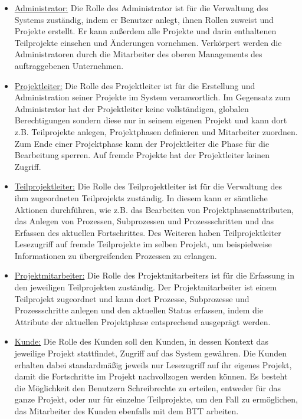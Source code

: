 \begin{itemize}
    \item[] \underline{Administrator:} Die Rolle des Administrator ist für die Verwaltung des Systems zuständig, indem er Benutzer anlegt, ihnen Rollen zuweist und Projekte erstellt. Er kann außerdem alle Projekte und darin enthaltenen Teilprojekte einsehen und Änderungen vornehmen. Verkörpert werden die Administratoren durch die Mitarbeiter des oberen Managements des auftraggebenen Unternehmen.
    
    \item[] \underline{Projektleiter:} Die Rolle des Projektleiter ist für die Erstellung und Administration seiner Projekte im System veranwortlich. Im Gegensatz zum Administrator hat der Projektleiter keine vollständigen, globalen Berechtigungen sondern diese nur in seinem eigenen Projekt und kann dort z.B. Teilprojekte anlegen, Projektphasen definieren und Mitarbeiter zuordnen. Zum Ende einer Projektphase kann der Projektleiter die Phase für die Bearbeitung sperren. Auf fremde Projekte hat der Projektleiter keinen Zugriff. 
    
    \item[] \underline{Teilprojektleiter:} Die Rolle des Teilprojektleiter ist für die Verwaltung des ihm zugeordneten Teilprojekts zuständig. In diesem kann er sämtliche Aktionen durchführen, wie z.B. das Bearbeiten von Projektphasenattributen, das Anlegen von Prozessen, Subprozessen und Prozessschritten und das Erfassen des aktuellen Fortschrittes. Des Weiteren haben Teilprojektleiter Lesezugriff auf fremde Teilprojekte im selben Projekt, um beispielweise Informationen zu übergreifenden Prozessen zu erlangen.

    \item[] \underline{Projektmitarbeiter:} Die Rolle des Projektmitarbeiters ist für die Erfassung in den jeweiligen Teilprojekten zuständig. Der Projektmitarbeiter ist einem Teilprojekt zugeordnet und kann dort Prozesse, Subprozesse und Prozessschritte anlegen und den aktuellen Status erfassen, indem die Attribute der aktuellen Projektphase entsprechend ausgeprägt werden.

    \item[] \underline{Kunde:} Die Rolle des Kunden soll den Kunden, in dessen Kontext das jeweilige Projekt stattfindet, Zugriff auf das System gewähren. Die Kunden erhalten dabei standardmäßig jeweils nur Lesezugriff auf ihr eigenes Projekt, damit die Fortschritte im Projekt nachvollzogen werden können. Es besteht die Möglichkeit den Benutzern Schreibrechte zu erteilen, entweder für das ganze Projekt, oder nur für einzelne Teilprojekte, um den Fall zu ermöglichen, das Mitarbeiter des Kunden ebenfalls mit dem BTT arbeiten.  
\end{itemize}

